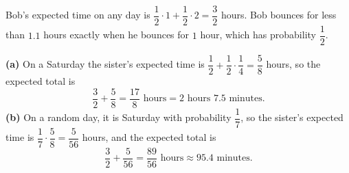 Bob's expected time on any day is $\dfrac12\cdot1+\dfrac12\cdot2=\dfrac32$ hours. Bob bounces for less than $1.1$ hours exactly when he bounces for $1$ hour, which has probability $\dfrac12$.

\textbf{(a)} On a Saturday the sister's expected time is $\dfrac12+\dfrac12\cdot\dfrac14=\dfrac58$ hours, so the expected total is
\[\dfrac32+\dfrac58=\boxed{\dfrac{17}{8}\text{ hours}}=2\text{ hours }7.5\text{ minutes}.\]
\textbf{(b)} On a random day, it is Saturday with probability $\dfrac17$, so the sister's expected time is $\dfrac17\cdot\dfrac58=\dfrac{5}{56}$ hours, and the expected total is
\[\dfrac32+\dfrac{5}{56}=\boxed{\dfrac{89}{56}\text{ hours}}\approx95.4\text{ minutes}.\]
